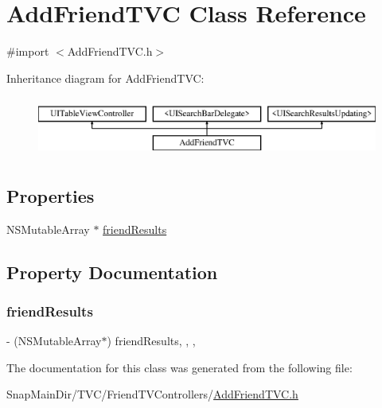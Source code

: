 \hypertarget{interface_add_friend_t_v_c}{}\section{Add\+Friend\+T\+VC Class Reference}
\label{interface_add_friend_t_v_c}


{\ttfamily \#import $<$Add\+Friend\+T\+V\+C.\+h$>$}

Inheritance diagram for Add\+Friend\+T\+VC\+:\begin{figure}[H]
\begin{center}
\leavevmode
\includegraphics[height=2.000000cm]{interface_add_friend_t_v_c}
\end{center}
\end{figure}
\subsection*{Properties}
\begin{DoxyCompactItemize}
\item 
N\+S\+Mutable\+Array $\ast$ \hyperlink{interface_add_friend_t_v_c_a8588d0641fa3be1ee69239991335b090}{friend\+Results}
\end{DoxyCompactItemize}


\subsection{Property Documentation}
\hypertarget{interface_add_friend_t_v_c_a8588d0641fa3be1ee69239991335b090}{}\label{interface_add_friend_t_v_c_a8588d0641fa3be1ee69239991335b090} 
\subsubsection{\texorpdfstring{friend\+Results}{friendResults}}
{\footnotesize\ttfamily -\/ (N\+S\+Mutable\+Array$\ast$) friend\+Results\hspace{0.3cm}{\ttfamily [read]}, {\ttfamily [write]}, {\ttfamily [nonatomic]}, {\ttfamily [strong]}}



The documentation for this class was generated from the following file\+:\begin{DoxyCompactItemize}
\item 
Snap\+Main\+Dir/\+T\+V\+C/\+Friend\+T\+V\+Controllers/\hyperlink{_add_friend_t_v_c_8h}{Add\+Friend\+T\+V\+C.\+h}\end{DoxyCompactItemize}

